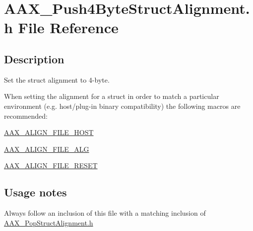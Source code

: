 \hypertarget{a00668}{}\section{A\+A\+X\+\_\+\+Push4\+Byte\+Struct\+Alignment.\+h File Reference}
\label{a00668}


\subsection{Description}
Set the struct alignment to 4-\/byte. 

When setting the alignment for a struct in order to match a particular environment (e.\+g. host/plug-\/in binary compatibility) the following macros are recommended\+: \begin{DoxyItemize}
\item \mbox{\hyperlink{a00392_acbef7ed7d077bc9812cb56417e1ad325}{A\+A\+X\+\_\+\+A\+L\+I\+G\+N\+\_\+\+F\+I\+L\+E\+\_\+\+H\+O\+ST}} \item \mbox{\hyperlink{a00392_a8fbeac3c5db5ac694e85a021ed74dc9e}{A\+A\+X\+\_\+\+A\+L\+I\+G\+N\+\_\+\+F\+I\+L\+E\+\_\+\+A\+LG}} \item \mbox{\hyperlink{a00392_a8aaaefcc3d87025e84d5ccb99b650a87}{A\+A\+X\+\_\+\+A\+L\+I\+G\+N\+\_\+\+F\+I\+L\+E\+\_\+\+R\+E\+S\+ET}}\end{DoxyItemize}
\hypertarget{a00668_AAX_Push4ByteStructAlignment_usagenotes}{}\subsection{Usage notes}\label{a00668_AAX_Push4ByteStructAlignment_usagenotes}
\begin{DoxyItemize}
\item Always follow an inclusion of this file with a matching inclusion of \mbox{\hyperlink{a00653}{A\+A\+X\+\_\+\+Pop\+Struct\+Alignment.\+h}}\end{DoxyItemize}
